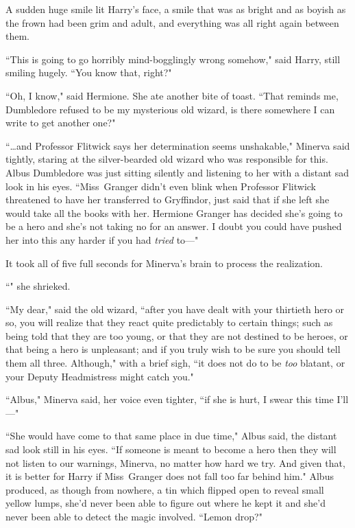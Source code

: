A sudden huge smile lit Harry's face, a smile that was as bright and as boyish as the frown had been grim and adult, and everything was all right again between them.

``This is going to go horribly mind-bogglingly wrong somehow," said Harry, still smiling hugely. ``You know that, right?"

``Oh, I know," said Hermione. She ate another bite of toast. ``That reminds me, Dumbledore refused to be my mysterious old wizard, is there somewhere I can write to get another one?"


``{\ldots}and Professor Flitwick says her determination seems unshakable," Minerva said tightly, staring at the silver-bearded old wizard who was responsible for this. Albus Dumbledore was just sitting silently and listening to her with a distant sad look in his eyes. ``Miss~Granger didn't even blink when Professor Flitwick threatened to have her transferred to Gryffindor, just said that if she left she would take all the books with her. Hermione Granger has decided she's going to be a hero and she's not taking no for an answer. I doubt you could have pushed her into this any harder if you had \emph{tried} to—"

It took all of five full seconds for Minerva's brain to process the realization.

``" she shrieked.

``My dear," said the old wizard, ``after you have dealt with your thirtieth hero or so, you will realize that they react quite predictably to certain things; such as being told that they are too young, or that they are not destined to be heroes, or that being a hero is unpleasant; and if you truly wish to be sure you should tell them all three. Although," with a brief sigh, ``it does not do to be \emph{too} blatant, or your Deputy Headmistress might catch you."

``Albus," Minerva said, her voice even tighter, ``if she is hurt, I swear this time I'll—"

``She would have come to that same place in due time," Albus said, the distant sad look still in his eyes. ``If someone is meant to become a hero then they will not listen to our warnings, Minerva, no matter how hard we try. And given that, it is better for Harry if Miss~Granger does not fall too far behind him." Albus produced, as though from nowhere, a tin which flipped open to reveal small yellow lumps, she'd never been able to figure out where he kept it and she'd never been able to detect the magic involved. ``Lemon drop?"

